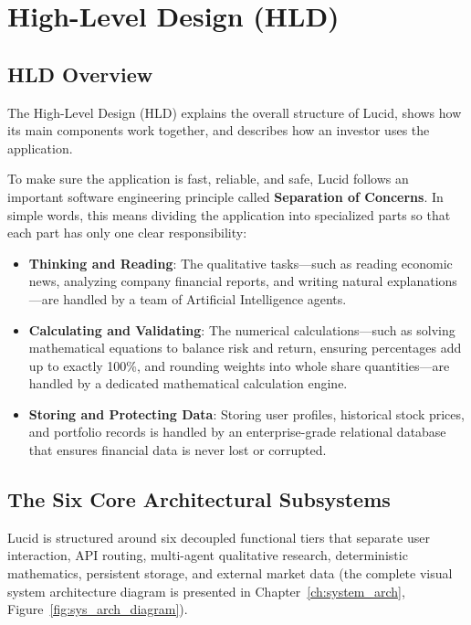\chapter{High-Level Design (HLD)}

\section{HLD Overview}
The High-Level Design (HLD) explains the overall structure of Lucid, shows how its main components work together, and describes how an investor uses the application.

To make sure the application is fast, reliable, and safe, Lucid follows an important software engineering principle called \textbf{Separation of Concerns}. In simple words, this means dividing the application into specialized parts so that each part has only one clear responsibility:
\begin{itemize}
    \item \textbf{Thinking and Reading}: The qualitative tasks—such as reading economic news, analyzing company financial reports, and writing natural explanations—are handled by a team of Artificial Intelligence agents.
    \item \textbf{Calculating and Validating}: The numerical calculations—such as solving mathematical equations to balance risk and return, ensuring percentages add up to exactly 100\%, and rounding weights into whole share quantities—are handled by a dedicated mathematical calculation engine.
    \item \textbf{Storing and Protecting Data}: Storing user profiles, historical stock prices, and portfolio records is handled by an enterprise-grade relational database that ensures financial data is never lost or corrupted.
\end{itemize}

\section{The Six Core Architectural Subsystems}
Lucid is structured around six decoupled functional tiers that separate user interaction, API routing, multi-agent qualitative research, deterministic mathematics, persistent storage, and external market data (the complete visual system architecture diagram is presented in Chapter~\ref{ch:system_arch}, Figure~\ref{fig:sys_arch_diagram}).


